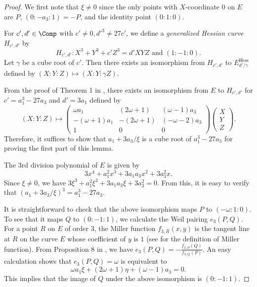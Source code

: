 \documentclass{amsart}
\theoremstyle{definition}
\theoremstyle{remark}
\numberwithin{equation}{section}
\begin{document}
\begin{proof}
    We first note that $\xi \neq 0$
    since the only points with $X$-coordinate $0$ on $E$
    are $P$, $(0:-a_3:1) = -P$, and the identity point $(0:1:0)$.

    For $c', d' \in \Comp$ with $c' \neq 0, d'^3 \neq 27c'$,
    we define a \emph{generalized Hessian curve} $H_{c', d'}$ by
    \begin{equation*}
        H_{c', d'} : X^3 + Y^3 + c'Z^3 = d' XYZ \text{ and } (1 : -1 : 0).
    \end{equation*}
    Let $\gamma$ be a cube root of $c'$.
    Then there exists an isomorphism from $H_{c', d'}$ to $E_{d'/\gamma}^\mathrm{Hess}$
    defined by $(X:Y:Z) \mapsto (X:Y:\gamma Z)$.

    From the proof of Theorem 1 in \cite{PKC:FarJoy10},
    there exists an isomorphism from $E$ to $H_{c', d'}$
    for $c' = a_1^3 - 27 a_3$ and $d' = 3a_1$
    defined by
    \begin{equation}\label{eq:isom_E_to_Hess}
        (X:Y:Z) \mapsto
            \begin{pmatrix}
                \omega a_1 & (2\omega + 1) & (\omega - 1)a_3 \\
                -(\omega + 1)a_1 & -(2\omega + 1) & (-\omega - 2)a_3 \\
                1 & 0 & 0
            \end{pmatrix}
            \begin{pmatrix}
                X \\ Y \\ Z
            \end{pmatrix}.
    \end{equation}
    Therefore, it suffices to show that $a_1 + 3a_3/\xi$ is a cube root of $a_1^3 - 27 a_3$
    for proving the first part of this lemma.

    The $3$rd division polynomial of $E$ is given by
    \begin{equation*}
        3x^4 + a_1^2 x^3 + 3a_1 a_3 x^2 + 3a_3^2x.
    \end{equation*}
    Since $\xi \neq 0$,
    we have $3\xi^3 + a_1^2 \xi^2 + 3a_1 a_3 \xi + 3a_3^2 = 0$.
    From this, it is easy to verify that
    $(a_1 + 3a_3/\xi)^3 = a_1^3 - 27 a_3$.

    It is straightforward to check that
    the above isomorphism maps $P$ to $(-\omega:1:0)$.
    To see that it maps $Q$ to $(0:-1:1)$,
    we calculate the Weil pairing $e_3(P, Q)$.
    For a point $R$ on $E$ of order $3$,
    the Miller function $f_{3, R}(x, y)$
    is the tangent line at $R$ on the curve $E$ whose coefficient of $y$ is $1$
    (see \cite[\S 4.1]{JC:Miller04} for the definition of Miller function).
    From Proposition 8 in \cite{JC:Miller04},
    we have
    $e_3(P, Q) = -\frac{f_{3, P}(Q)}{f_{3, Q}(P)}$.
    An easy calculation shows that $e_3(P, Q) = \omega$ is equivalent to
    \begin{equation*}
        \omega a_1 \xi + (2\omega + 1)\eta + (\omega - 1)a_3 = 0.
    \end{equation*}
    This implies that
    the image of $Q$ under the above isomorphism is $(0:-1:1)$.
\end{proof}
\end{document}
